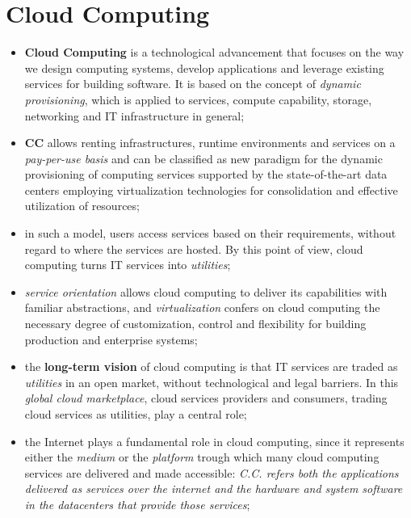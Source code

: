\documentclass[oneside]{article}
\begin{document}
\section{Cloud Computing}
\begin{itemize}
    \item \textbf{Cloud Computing} is a technological advancement that focuses on the way we design computing systems, develop applications and leverage existing services for building software. It is based on the concept of \textit{dynamic provisioning}, which is applied to services, compute capability, storage, networking and IT infrastructure in general;
    
    \item \textbf{CC} allows renting infrastructures, runtime environments and services on a \textit{pay-per-use basis} and can be classified as new paradigm for the dynamic provisioning of computing services supported by the state-of-the-art data centers employing virtualization technologies for consolidation and effective utilization of resources;
    
    \item in such a model, users access services based on their requirements, without regard to where the services are hosted. By this point of view, cloud computing turns IT services into \textit{utilities};
    
    \item \textit{service orientation} allows cloud computing to deliver its capabilities with familiar abstractions, and \textit{virtualization} confers on cloud computing the necessary degree of customization, control and flexibility for building production and enterprise systems;
    
    \item the \textbf{long-term vision} of cloud computing is that IT services are traded as \textit{utilities} in an open market, without technological and legal barriers. In this \textit{global cloud marketplace}, cloud services providers and consumers, trading cloud services as utilities, play a central role;
    
    \item the Internet plays a fundamental role in cloud computing, since it represents either the \textit{medium} or the \textit{platform} trough which many cloud computing services are delivered and made accessible: \textit{C.C. refers both the applications delivered as services over the internet and the hardware and system software in the datacenters that provide those services};


\end{itemize}
\end{document}
